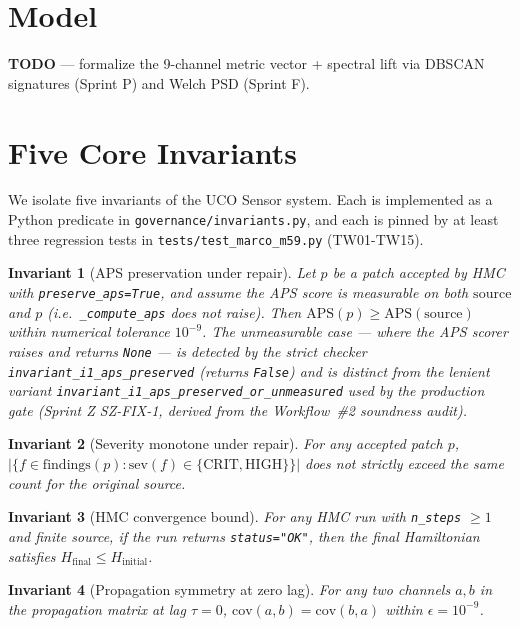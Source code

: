 \documentclass[acmsmall, screen]{acmart}
\newtheorem{invariant}{Invariant}
\begin{document}
\section{Model}
\label{sec:model}

\textbf{TODO} — formalize the 9-channel metric vector + spectral lift
via DBSCAN signatures (Sprint P) and Welch PSD (Sprint F).

\section{Five Core Invariants}
\label{sec:invariants}

We isolate five invariants of the UCO Sensor system.  Each is
implemented as a Python predicate in
\texttt{governance/invariants.py}, and each is pinned by at least three
regression tests in \texttt{tests/test\_marco\_m59.py} (TW01-TW15).

\begin{invariant}[APS preservation under repair]
\label{inv:i1}
Let $p$ be a patch accepted by HMC with \texttt{preserve\_aps=True},
and assume the APS score is measurable on both
$\mathrm{source}$ and $p$ (i.e.\ \texttt{\_compute\_aps} does not
raise).  Then $\mathrm{APS}(p) \geq \mathrm{APS}(\mathrm{source})$
within numerical tolerance $10^{-9}$.
The unmeasurable case --- where the APS scorer raises and returns
\texttt{None} --- is detected by the strict checker
\texttt{invariant\_i1\_aps\_preserved} (returns \texttt{False}) and is
distinct from the lenient variant
\texttt{invariant\_i1\_aps\_preserved\_or\_unmeasured} used by the
production gate (Sprint Z SZ-FIX-1, derived from the Workflow~\#2
soundness audit).
\end{invariant}

\begin{invariant}[Severity monotone under repair]
\label{inv:i2}
For any accepted patch $p$, $|\{f \in \mathrm{findings}(p) :
\mathrm{sev}(f) \in \{\mathrm{CRIT, HIGH}\}\}|$ does not strictly
exceed the same count for the original source.
\end{invariant}

\begin{invariant}[HMC convergence bound]
\label{inv:i3}
For any HMC run with \texttt{n\_steps} $\geq 1$ and finite source, if
the run returns \texttt{status="OK"}, then the final Hamiltonian
satisfies $H_{\mathrm{final}} \leq H_{\mathrm{initial}}$.
\end{invariant}

\begin{invariant}[Propagation symmetry at zero lag]
\label{inv:i4}
For any two channels $a, b$ in the propagation matrix at lag $\tau = 0$,
$\mathrm{cov}(a, b) = \mathrm{cov}(b, a)$ within $\epsilon = 10^{-9}$.
\end{invariant}
\end{document}
